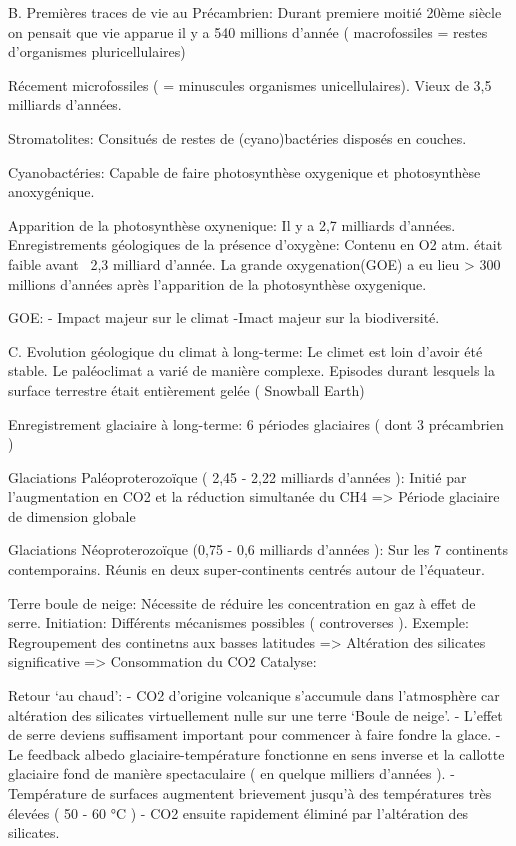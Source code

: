 B. Premières traces de vie au Précambrien:
Durant premiere moitié 20ème siècle on pensait que vie apparue il y a 540 millions d’année ( macrofossiles = restes d’organismes pluricellulaires)


Récement microfossiles ( = minuscules organismes unicellulaires). Vieux de 3,5 milliards d’années.


Stromatolites:
Consitués de restes de (cyano)bactéries disposés en couches.


Cyanobactéries:
Capable de faire photosynthèse oxygenique et photosynthèse anoxygénique.




Apparition de la photosynthèse oxynenique:
Il y a 2,7 milliards d’années.
Enregistrements géologiques de la présence d’oxygène:
Contenu en O2 atm. était faible avant ~2,3 milliard d’année.
La grande oxygenation(GOE) a eu lieu > 300 millions d’années après l’apparition de la photosynthèse oxygenique.


GOE: - Impact majeur sur le climat
        -Imact majeur sur la biodiversité.


C. Evolution géologique du climat à long-terme:
Le climet est loin d’avoir été stable. Le paléoclimat a varié de manière complexe.
Episodes durant lesquels la surface terrestre était entièrement gelée ( Snowball Earth)


Enregistrement glaciaire à long-terme:
6 périodes glaciaires ( dont 3 précambrien )


Glaciations Paléoproterozoïque ( 2,45 - 2,22 milliards d’années ):
Initié par l’augmentation en CO2 et la réduction simultanée du CH4
=> Période glaciaire de dimension globale


Glaciations Néoproterozoïque (0,75 - 0,6 milliards d’années ):
Sur les 7 continents contemporains.
Réunis en deux super-continents centrés autour de l’équateur.


Terre boule de neige:
Nécessite de réduire les concentration en gaz à effet de serre.
Initiation:
Différents mécanismes possibles ( controverses ).
Exemple: Regroupement des continetns aux basses latitudes => Altération des silicates significative => Consommation du CO2
Catalyse:
  



Retour ‘au chaud’:
- CO2 d’origine volcanique s’accumule dans l’atmosphère car altération des silicates virtuellement nulle sur une terre ‘Boule de neige’.
- L’effet de serre deviens suffisament important pour commencer à faire fondre la glace.
- Le feedback albedo glaciaire-température fonctionne en sens inverse et la callotte glaciaire fond de manière spectaculaire ( en quelque milliers d’années ).
- Température de surfaces augmentent brievement jusqu’à des températures très élevées ( 50 - 60 °C )
- CO2 ensuite rapidement éliminé par l’altération des silicates.


